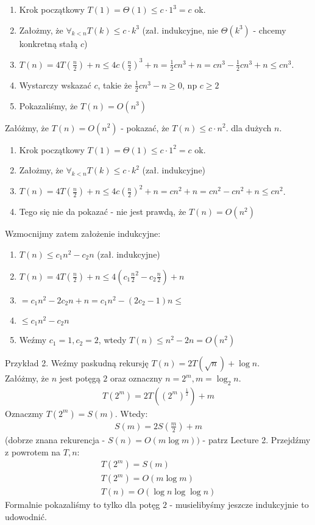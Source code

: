 \documentclass{article}
\begin{document}
\begin{enumerate}
    \item Krok początkowy $T(1) = \Theta(1) \leq c\cdot 1^3 = c$ ok.
    \item Założmy, że $\forall_{k<n}  T(k) \leq c\cdot k^3$ (zał. indukcyjne, nie $\Theta(k^3)$ - chcemy konkretną stałą $c$)
    \item $T(n) = 4T\left(\frac{n}{2}\right) + n \leq 4c\left(\frac{n}{2}\right)^3 + n = \frac{1}{2}cn^3 + n = cn^3 - \frac{1}{2}cn^3 + n \leq cn^3$.
    \item Wystarczy wskazać $c$, takie że $\frac{1}{2}cn^3 - n \geq 0$, np $c\geq 2$
    \item Pokazaliśmy, że $T(n) = O(n^3)$
\end{enumerate}
Załóżmy, że $T(n)=O(n^2)$ - pokazać, że $T(n)\leq c\cdot n^2$. dla dużych $n$.
\begin{enumerate}
    \item Krok początkowy $T(1) = \Theta(1) \leq c\cdot 1^2 = c$ ok.
    \item Założmy, że $\forall_{k<n}  T(k) \leq c\cdot k^2$ (zał. indukcyjne)
    \item $T(n) = 4T\left(\frac{n}{2}\right) + n \leq 4c\left(\frac{n}{2}\right)^2 + n = cn^2 + n = cn^2 - cn^2 + n \leq cn^2$.
    \item Tego się nie da pokazać - nie jest prawdą, że $T(n) = O(n^2)$
\end{enumerate}
Wzmocnijmy zatem założenie indukcyjne:
\begin{enumerate}
    \item $T(n) \leq c_1 n^2 - c_2 n$ (zał. indukcyjne)
    \item $T(n) = 4T\left(\frac{n}{2}\right) + n \leq 4(c_1 \frac{n}{2}^2 - c_2 \frac{n}{2}) + n$
    \item $= c_1 n^2 - 2c_2 n + n = c_1n^2 - (2c_2 -1)n \leq$
    \item $\leq c_1n^2 - c_2n$
    \item Weźmy $c_1=1, c_2=2$, wtedy $T(n) \leq n^2 - 2n = O(n^2)$
\end{enumerate}

\noindent
Przykład 2. Weźmy paskudną rekursję $T(n) = 2T(\sqrt{n}) + \log n$.\\
Załóżmy, że $n$ jest potęgą $2$ oraz oznaczny $n=2^m, m=\log_2 n$.
\begin{align}
    T(2^m) = 2T((2^m)^\frac{1}{2}) + m
\end{align}
Oznaczmy $T(2^m) = S(m)$. Wtedy:
\begin{align}
    S(m) = 2S\left(\frac{m}{2}\right) + m
\end{align}
(dobrze znana rekurencja - $S(n) = O(m\log m))$ - patrz Lecture 2.
Przejdźmy z powrotem na $T,n$:
\begin{align}
    T(2^m) = S(m)\\
    T(2^m) = O(m \log m)\\
    T(n) = O(\log n \log \log n)
\end{align}
Formalnie pokazaliśmy to tylko dla potęg $2$ - musielibyśmy jeszcze indukcyjnie to udowodnić.\\
\end{document}
